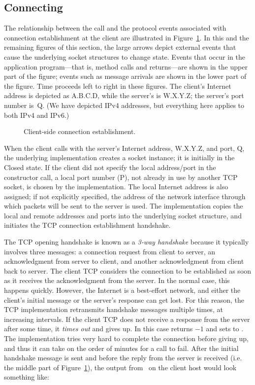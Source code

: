 \subsection{Connecting}
\label{sect:connecting}%

The relationship between the  call and
the protocol events associated with
connection establishment at the client are
illustrated in Figure~\ref{fsm0}.  In this and the remaining figures
of this section, the large arrows depict external events that cause
the underlying socket structures to change state.  Events that occur
in the application program---that is, method calls and returns---are
shown in the upper part of the figure; events such as message arrivals
are shown in the lower part of the figure.  Time proceeds left to
right in these figures.  The client's Internet address is depicted as
A.B.C.D, while the server's is W.X.Y.Z; the server's port number is~Q.
(We have depicted IPv4 addresses, but everything here applies to both
IPv4 and IPv6.)
\begin{figure}
\caption{\label{fsm0}Client-side connection establishment.}
\end{figure}

When the client calls 
with the server's Internet address, W.X.Y.Z, and port, Q,
the underlying implementation creates a socket instance; it is
initially in the Closed state.  If the client did not specify the
local address/port in the constructor call, a local port number (P),
not already in use by another TCP socket, is chosen by the
implementation.  The local Internet address is also assigned; if not
explicitly specified, the address of the network interface through
which packets will be sent to the server is used.  The implementation
copies the local and remote addresses and ports into the underlying
socket structure, and initiates the TCP connection establishment
handshake.

The TCP opening handshake is known as a \emph{3-way handshake} because
it typically involves three messages: a connection request from client
to server, an acknowledgment from server to client, and another
acknowledgment from client back to server.  The client TCP considers
the connection to be established as soon as it receives the
acknowledgment from the server.  In the normal case, this happens
quickly.  However, the Internet is a best-effort network, and either
the client's initial message or the server's response can get lost.
For this reason, the TCP implementation retransmits handshake messages
multiple times, at increasing intervals.  If the client TCP does not
receive a response from the server after some time, it \emph{times
out} and gives up.  In this case  returns $-1$ and sets
 to .
The implementation tries very hard to complete the connection before
giving up, and thus it can take on the
order of minutes for a  call to fail.
%
After the initial handshake message is sent and before the
reply from the server is received (i.e. the middle part of
Figure~\ref{fsm0}), the output from \netstat\ on the
client host would look something like:

